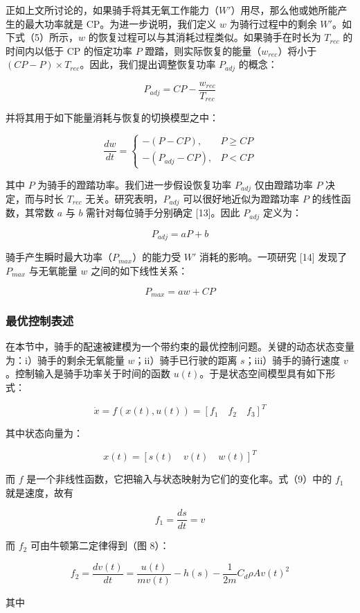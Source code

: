 \documentclass[11pt,a4paper]{ctexart}
\begin{document}
正如上文所讨论的，如果骑手将其无氧工作能力（$W'$）用尽，那么他或她所能产生的最大功率就是 CP。为进一步说明，我们定义 $w$ 为骑行过程中的剩余 $W'$。如下式（5）所示，$w$ 的恢复过程可以与其消耗过程类似。如果骑手在时长为 $T_{rec}$ 的时间内以低于 CP 的恒定功率 $P$ 蹬踏，则实际恢复的能量（$w_{rec}$）将小于 $(CP-P)\times T_{rec}$。因此，我们提出调整恢复功率 $P_{adj}$ 的概念：

\[
P_{adj}=CP-\frac{w_{rec}}{T_{rec}}
\]

并将其用于如下能量消耗与恢复的切换模型之中：

\[
\frac{dw}{dt}=\left\{\begin{array}{ll}-(P-CP), & P\geq CP\\[0.3em] -\left(P_{adj}-CP\right), & P<CP\end{array}\right.
\]

其中 $P$ 为骑手的蹬踏功率。我们进一步假设恢复功率 $P_{adj}$ 仅由蹬踏功率 $P$ 决定，而与时长 $T_{rec}$ 无关。研究表明，$P_{adj}$ 可以很好地近似为蹬踏功率 $P$ 的线性函数，其常数 $a$ 与 $b$ 需针对每位骑手分别确定 [13]。因此 $P_{adj}$ 定义为：

\[
P_{adj}=aP+b
\]

骑手产生瞬时最大功率（$P_{max}$）的能力受 $W'$ 消耗的影响。一项研究 [14] 发现了 $P_{max}$ 与无氧能量 $w$ 之间的如下线性关系：

\[
P_{max}=aw+CP
\]

\subsubsection{最优控制表述}

在本节中，骑手的配速被建模为一个带约束的最优控制问题。关键的动态状态变量为：i）骑手的剩余无氧能量 $w$；ii）骑手已行驶的距离 $s$；iii）骑手的骑行速度 $v$。控制输入是骑手功率关于时间的函数 $u(t)$。于是状态空间模型具有如下形式：

\[
\dot{x}=f(x(t),u(t))=\left[f_1\quad f_2\quad f_3\right]^{T}
\]

其中状态向量为：

\[
x(t)=\left[s(t)\quad v(t)\quad w(t)\right]^{T}
\]

而 $f$ 是一个非线性函数，它把输入与状态映射为它们的变化率。式（9）中的 $f_1$ 就是速度，故有

\[
f_1=\frac{ds}{dt}=v
\]

而 $f_2$ 可由牛顿第二定律得到（图 8）：

\[
f_2=\frac{dv(t)}{dt}=\frac{u(t)}{mv(t)}-h(s)-\frac{1}{2m}C_d\rho Av(t)^2
\]

其中
\end{document}
